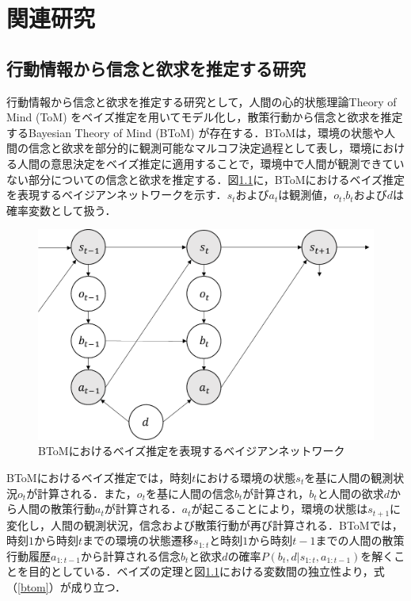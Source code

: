 \chapter{関連研究}

\section{行動情報から信念と欲求を推定する研究}
\par
行動情報から信念と欲求を推定する研究として，人間の心的状態理論Theory of Mind (ToM) \cite{子安増生1997心の理論}をベイズ推定を用いてモデル化し，散策行動から信念と欲求を推定するBayesian Theory of Mind (BToM) \cite{baker2011bayesian}が存在する．BToMは，環境の状態や人間の信念と欲求を部分的に観測可能なマルコフ決定過程\cite{alma9926438829904034}として表し，環境における人間の意思決定をベイズ推定に適用することで，環境中で人間が観測できていない部分についての信念と欲求を推定する．図\ref{fig:btom}に，BToMにおけるベイズ推定を表現するベイジアンネットワーク\cite{alma9926301926204034}を示す．$s_t$および$a_t$は観測値，$o_t$,$b_t$および$d$は確率変数として扱う．
\begin{figure}[htbp]
  \begin{center}
    \includegraphics[scale=0.7]{./btom.pdf}
    \caption{BToMにおけるベイズ推定を表現するベイジアンネットワーク}
    \label{fig:btom}
  \end{center}
\end{figure}
BToMにおけるベイズ推定では，時刻$t$における環境の状態$s_{t}$を基に人間の観測状況$o_{t}$が計算される．また，$o_{t}$を基に人間の信念$b_{t}$が計算され，$b_{t}$と人間の欲求$d$から人間の散策行動$a_{t}$が計算される．$a_{t}$が起こることにより，環境の状態は$s_{t+1}$に変化し，人間の観測状況，信念および散策行動が再び計算される．BToMでは，時刻$1$から時刻$t$までの環境の状態遷移$s_{1:t}$と時刻$1$から時刻$t-1$までの人間の散策行動履歴$a_{1:t-1}$から計算される信念$b_t$と欲求$d$の確率$P(b_t,d|s_{1:t},a_{1:t-1})$を解くことを目的としている．ベイズの定理\cite{ベイズ}と図\ref{fig:btom}における変数間の独立性\cite{ベイズ}より，式（\ref{btom}）が成り立つ．
